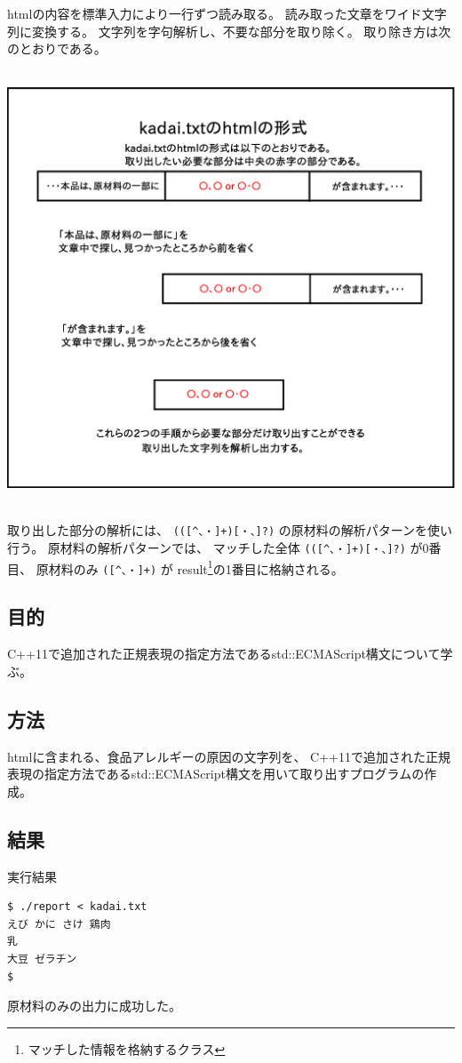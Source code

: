 \documentclass[a4j]{jarticle}
\begin{document}
htmlの内容を標準入力により一行ずつ読み取る。
読み取った文章をワイド文字列に変換する。
文字列を字句解析し、不要な部分を取り除く。
取り除き方は次のとおりである。\\
\\
\centerline{\includegraphics[width=15cm]{dia1.eps}}
\\
取り出した部分の解析には、 \verb|(([^、・]+)[・、]?)| の原材料の解析パターンを使い行う。
原材料の解析パターンでは、
マッチした全体 \verb|(([^、・]+)[・、]?)| が0番目、
原材料のみ \verb|([^、・]+)| が
result\footnote{マッチした情報を格納するクラス}の1番目に格納される。


\subsection{目的}
C++11で追加された正規表現の指定方法であるstd::ECMAScript構文について学ぶ。

\subsection{方法}
htmlに含まれる、食品アレルギーの原因の文字列を、
C++11で追加された正規表現の指定方法であるstd::ECMAScript構文を用いて取り出すプログラムの作成。

\subsection{結果}
実行結果
\begin{screen}
\begin{verbatim}
$ ./report < kadai.txt
えび かに さけ 鶏肉 
乳 
大豆 ゼラチン 
$
\end{verbatim}
\end{screen}
原材料のみの出力に成功した。
\end{document}
